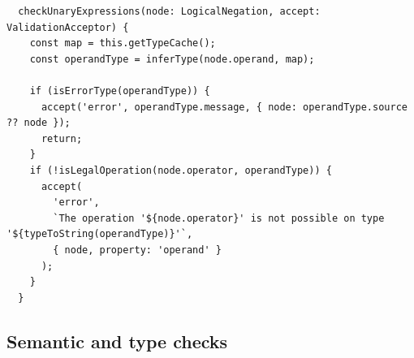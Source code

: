 \begin{verbatim}
  checkUnaryExpressions(node: LogicalNegation, accept: ValidationAcceptor) {
    const map = this.getTypeCache();
    const operandType = inferType(node.operand, map);

    if (isErrorType(operandType)) {
      accept('error', operandType.message, { node: operandType.source ?? node });
      return;
    }
    if (!isLegalOperation(node.operator, operandType)) {
      accept(
        'error',
        `The operation '${node.operator}' is not possible on type '${typeToString(operandType)}'`,
        { node, property: 'operand' }
      );
    }
  }
\end{verbatim}

\subsection{Semantic and type checks}


